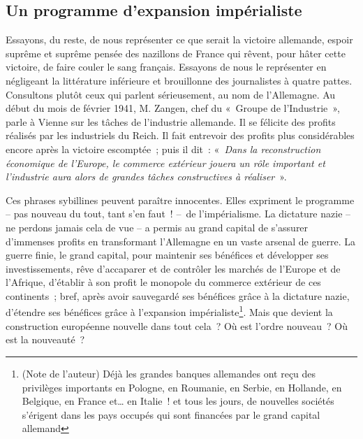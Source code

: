 \documentclass[french,twoside]{book} %
\begin{document}
\subsection[Un programme d’expansion impérialiste]{Un programme d’expansion impérialiste}
\noindent Essayons, du reste, de nous représenter ce que serait la victoire allemande, espoir suprême et suprême pensée des nazillons de France qui rêvent, pour hâter cette victoire, de faire couler le sang français. Essayons de nous le représenter en négligeant la littérature inférieure et brouillonne des journalistes à quatre pattes. Consultons plutôt ceux qui parlent sérieusement, au nom de l’Allemagne. Au début du mois de février 1941, M. Zangen, chef du « Groupe de l’Industrie », parle à Vienne sur les tâches de l’industrie allemande. Il se félicite des profits réalisés par les industriels du Reich. Il fait entrevoir des profits plus considérables encore après la victoire escomptée ; puis il dit : « \emph{Dans la reconstruction économique de l’Europe, le commerce extérieur jouera un rôle important et l’industrie aura alors de grandes tâches constructives à réaliser} ».\par
Ces phrases sybillines peuvent paraître innocentes. Elles expriment le programme – pas nouveau du tout, tant s’en faut ! – de l’impérialisme. La dictature nazie – ne perdons jamais cela de vue – a permis au grand capital de s’assurer d’immenses profits en transformant l’Allemagne en un vaste arsenal de guerre. La guerre finie, le grand capital, pour maintenir ses bénéfices et développer ses investissements, rêve d’accaparer et de contrôler les marchés de l’Europe et de l’Afrique, d’établir à son profit le monopole du commerce extérieur de ces continents ; bref, après avoir sauvegardé ses bénéfices grâce à la dictature nazie, d’étendre ses bénéfices grâce à l’expansion impérialiste\footnote{(Note de l’auteur) Déjà les grandes banques allemandes ont reçu des privilèges importants en Pologne, en Roumanie, en Serbie, en Hollande, en Belgique, en France et… en Italie ! et tous les jours, de nouvelles sociétés s’érigent dans les pays occupés qui sont financées par le grand capital allemand}. Mais que devient la construction européenne nouvelle dans tout cela ? Où est l’ordre nouveau ? Où est la nouveauté ?\par
\end{document}

